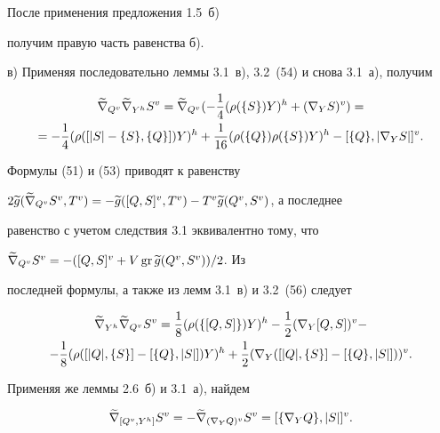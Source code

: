 \begin{pf}
После применения предложения 1.5~б)


получим правую часть равенства б).





в) Применяя последовательно леммы 3.1~в), 3.2~(54) и снова 3.1~а), получим


\begin{multline}




\grn{\gv{Q}}{\grn{\gh{Y}}{\gv{S}}}=\grn{\gv{Q}}{(-\4\gh{(\rho


(\{S\})Y)}+\gv{(\n{Y}{S})})}=\\


=-\4\gh{(\rho([|S|-\{S\},\{Q\}])Y)}+


\6\gh{(\rho(\{Q\})\rho(\{S\})Y)}-\gv{[\{Q\},|\n{Y}{S}|]}.


\end{multline}


Формулы (51) и (53) приводят к равенству


$2\g{g}(\grn{\gv{Q}}{\gv{S}},\gv{T})=-\g{g}(\gv{[Q,S]},\gv{T})-


\gv{T}\g{g}(\gv{Q},\gv{S})$, а последнее


равенство с учетом следствия 3.1 эквивалентно тому, что


$\widetilde\nabla_{{Q}{}^v}{{S}{}^v}=-({[Q,S]}{}^v+V\operatorname{gr}\widetilde {g}({Q}{}^v,{S}{}^v))/2$. Из


последней формулы, а также из лемм 3.1~в) и 3.2~(56) следует


\begin{multline}




\grn{\gh{Y}}{\grn{\gv{Q}}{\gv{S}}}=\8\gh{(\rho(\{[Q,S]\})Y)}-


\1\gv{(\n{Y}{[Q,S]})}-\\


-\8\gh{(\rho([|Q|,\{S\}]-[\{Q\},|S|])Y)}+\1\gv{(\n{Y}{([|Q|,\{S\}]-


[\{Q\},|S|]))}}.


\end{multline}


Применяя же леммы 2.6~б) и 3.1~а), найдем


\begin{equation}




\grn{[\gv{Q},\gh{Y}]}{\gv{S}}=-\grn{(\n{Y}{Q})^v}{\gv{S}}=


\gv {[\{\n{Y}{Q}\},|S|]}.



\end{equation}
\end{pf}
